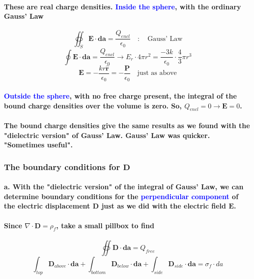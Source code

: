 \documentclass{article}
\begin{document}
\paragraph{These are real charge densities. \textcolor{blue}{Inside the sphere}, with the ordinary Gauss' Law}
\begin{equation*}
    \oiint_S\boldsymbol{E}\cdot\boldsymbol{da}=\frac{Q_{encl}}{\epsilon_0}\quad :\quad\text{Gauss' Law}
\end{equation*}
\begin{equation*}
    \oint\boldsymbol{E}\cdot\boldsymbol{da}=\frac{Q_{encl}}{\epsilon_0}\rightarrow E_r\cdot 4\pi r^2=\frac{-3k}{\epsilon_0}\cdot\frac{4}{3}\pi r^3
\end{equation*}
\begin{equation*}
    \boldsymbol{E}=-\frac{kr\hat{\boldsymbol{r}}}{\epsilon_0}=-\frac{\boldsymbol{P}}{\epsilon_0}\quad\text{just as above}
\end{equation*}
\paragraph{\textcolor{blue}{Outside the sphere}, with no free charge present, the integral of the bound charge densities over the volume is zero. So, $Q_{encl}=0\rightarrow \boldsymbol{E}=0$.}
\paragraph{The bound charge densities give the same results as we found with the "dielectric version" of Gauss' Law. Gauss' Law was quicker. "Sometimes useful".}
\subsubsection{The boundary conditions for $\boldsymbol{D}$}
\paragraph{a. With the "dielectric version" of the integral of Gauss' Law, we can determine boundary conditions for the \textcolor{blue}{perpendicular component} of the electric displacement $\boldsymbol{D}$ just as we did with the electric field $\boldsymbol{E}$.}
\paragraph{Since $\nabla\cdot\boldsymbol{D}=\rho_f$, take a small pillbox to find}
\begin{equation*}
    \oiint \boldsymbol{D}\cdot\boldsymbol{da}=Q_{free}
\end{equation*}
\begin{equation*}
    \int_{top}\boldsymbol{D}_{above}\cdot\boldsymbol{da}+\int_{bottom}\boldsymbol{D}_{below}\cdot\boldsymbol{da}+\int_{side}\boldsymbol{D}_{side}\cdot\boldsymbol{da}=\sigma_f\cdot da
\end{equation*}
\end{document}
